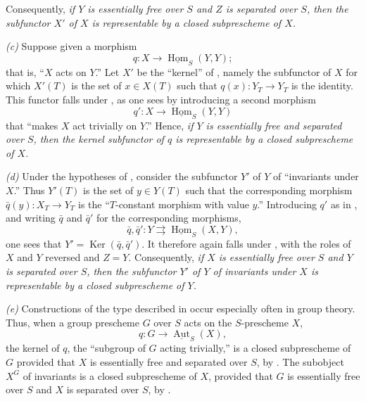 Consequently, \textit{if \(Y\) is essentially free over \(S\) and \(Z\)
is separated over \(S\), then the subfunctor \(X'\) of \(X\) is
representable by a closed subprescheme of \(X\).}

\smallskip
\noindent{}\textit{(c)}
Suppose given a morphism
\[
  q:X\longrightarrow\underline{\operatorname{Hom}}_S(Y,Y);
\]
that is, ``\(X\) acts on \(Y\).'' Let \(X'\) be the ``kernel'' of , namely the subfunctor of \(X\) for which \(X'(T)\) is the set
of \(x\in X(T)\) such that \(q(x):Y_T\to Y_T\) is the identity. This
functor falls under , as one sees by introducing a second morphism
\[
  q':X\longrightarrow\underline{\operatorname{Hom}}_S(Y,Y)
\]
that ``makes \(X\) act trivially on \(Y\).'' Hence, \textit{if \(Y\) is
essentially free and separated over \(S\), then the kernel subfunctor of
\(q\) is representable by a closed subprescheme of \(X\).}

\smallskip
\noindent{}\textit{(d)}
Under the hypotheses of , consider the subfunctor \(Y'\) of \(Y\) of
``invariants under \(X\).'' Thus \(Y'(T)\) is the set of \(y\in Y(T)\)
such that the corresponding morphism \(\bar q(y):X_T\to Y_T\) is the
``\(T\)-constant morphism with value \(y\).'' Introducing \(q'\) as in
, and writing \(\bar q\) and \(\bar q'\) for the corresponding morphisms,
\[
  \bar q,\bar q':Y\rightrightarrows
  \underline{\operatorname{Hom}}_S(X,Y),
\]
one sees that \(Y'=\operatorname{Ker}(\bar q,\bar q')\). It therefore again
falls under , with the roles of \(X\) and \(Y\) reversed and \(Z=Y\).
Consequently, \textit{if \(X\) is essentially free over \(S\) and \(Y\)
is separated over \(S\), then the subfunctor \(Y'\) of \(Y\) of
invariants under \(X\) is representable by a closed subprescheme of
\(Y\).}

\smallskip
\noindent{}\textit{(e)}
Constructions of the type described in  occur
especially often in group theory. Thus, when a group prescheme \(G\)
over \(S\) acts on the \(S\)-prescheme \(X\),
\[
  q:G\longrightarrow\underline{\operatorname{Aut}}_S(X),
\]
the kernel of \(q\), the ``subgroup of \(G\) acting trivially,'' is a
closed subprescheme of \(G\) provided that \(X\) is essentially free
and separated over \(S\), by . The subobject \(X^G\) of invariants
is a closed subprescheme of \(X\), provided that \(G\) is essentially
free over \(S\) and \(X\) is separated over
\(S\),
by .

